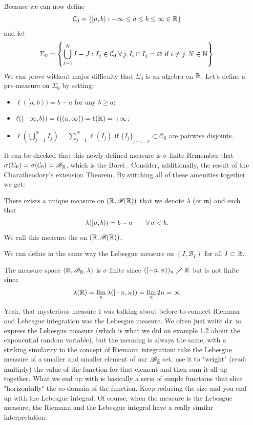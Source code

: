 \documentclass{report}
\begin{document}
\begin{revise}
Because we can now define
\[\mathcal{C}_0=\{[a,b):-\infty\leq a\leq b\leq\infty\in\mathbb{R}\}\]
and let
\[ \Sigma_0=\left\{\bigcup_{j=1}^N I-J:I_j\in\mathcal{C}_0\;\forall\, j,I_i\cap I_j=\varnothing\text{ if }i\neq j,N\in\mathbb{N} \right\} \]
We can prove without major difficulty that $\Sigma_0$ is an algebra on $\mathbb{R}$. Let's define a pre-measure on $\Sigma_0$ by setting:
\begin{itemize}
	\item $\ell([a,b))=b-a$ for any $b\geq a$;
	\item $\ell((-\infty,b))=\ell((a,\infty))=\ell(\mathbb{R})=+\infty$;
	\item $\ell\left(\bigcup_{j=1}^N I_j\right)=\sum_{j=1}^{N}\ell(I_j)$ if $\{I_j\}_{_{j=1,\ldots,N}}\subset\mathcal{C}_0$ are pairwise disjoints.
\end{itemize}
It can be checked that this newly defined measure is $\sigma$-finite
Remember that $\sigma(\Sigma_0)=\sigma(\mathcal{C}_0)=\mathscr{B}_{\mathbb{R}}$, which is the Borel \sa{}. 
Consider, additionally, the result of the Charatheodory's extension Theorem. By stitching all of these amenities together we get:
\begin{theorem}
	There exists a unique measure  on $(\mathbb{R},\mathscr{B}(\mathbb{R}))$ that we denote $\lambda$ (or $\mathfrak{m}$) and such that
	\[\lambda([a,b))=b-a\qquad\forall\, a<b.\]
	We call this measure the  on $(\mathbb{R},\mathscr{B}(\mathbb{R}))$.
\end{theorem}
\begin{remark}
	We can define in the same way the Lebesgue measure on $(I, \mathscr{B}_I)$ for all $I\subset\mathbb{R}$.
\end{remark}
\begin{remark}
	The measure space $(\mathbb{R},\mathscr{B}_{\mathbb{R}},\lambda)$ is $\sigma$-finite since $([-n,n))_n\nearrow\mathbb{R}$ but is not finite since
	\[ \lambda(\mathbb{R})=\lim_{n}\lambda([-n,n))=\lim_{n}2n=\infty\]
\end{remark}
\end{revise}
Yeah, that mysterious measure I was talking about before to connect Riemann and Lebesgue integration was the Lebesgue measure. We often just write $\mathop{}\!\mathrm{d} x$ to express the Lebesgue measure (which is what we did on example 1.2 about the exponential random variable), but the meaning is always the same, with a striking similarity to the concept of Riemann integration: take the Lebesgue measure of a smaller and smaller element of our $\mathscr{B}_{\overline{\mathbb{R}}}$ set, use it to "weight" (read: multiply) the value of the function for that element and then  sum it all up together. What we end up with is basically a serie of simple functions that slice "horizontally" the co-domain of the function. Keep reducing the size and you end up with the Lebesgue integral. Of course, when the measure is the Lebesgue measure, the Riemann and the Lebesgue integral have a really similar interpretation.\par
\end{document}
